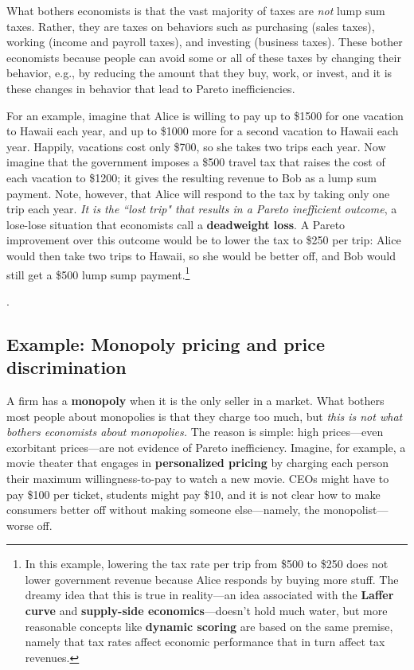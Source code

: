 What bothers economists is that the vast majority of taxes are \emph{not} lump sum taxes. Rather, they are taxes on behaviors such as purchasing (sales taxes), working (income and payroll taxes), and investing (business taxes). These bother economists because people can avoid some or all of these taxes by changing their behavior, e.g., by reducing the amount that they buy, work, or invest, and it is these changes in behavior that lead to Pareto inefficiencies.

For an example, imagine that Alice is willing to pay up to \$1500 for one vacation to Hawaii each year, and up to \$1000 more for a second vacation to Hawaii each year. Happily, vacations cost only \$700, so she takes two trips each year. Now imagine that the government imposes a \$500 travel tax that raises the cost of each vacation to \$1200; it gives the resulting revenue to Bob as a lump sum payment. Note, however, that Alice will respond to the tax by taking only one trip each year. \emph{It is the ``lost trip" that results in a Pareto inefficient outcome}, a  lose-lose situation that economists call a \textbf{deadweight loss}. A Pareto improvement over this outcome would be to lower the tax to \$250 per trip: Alice would then take two trips to Hawaii, so she would be better off, and Bob would still get a \$500 lump sump payment.\footnote{In this example, lowering the tax rate per trip from \$500 to \$250 does not lower government revenue because Alice responds by buying more stuff. The dreamy idea that this is true in reality---an idea associated with the \textbf{Laffer curve} and \textbf{supply-side economics}---doesn't hold much water, but more reasonable concepts like \textbf{dynamic scoring} are based on the same premise, namely that tax rates affect economic performance that in turn affect tax revenues.}

.





\subsection*{Example: Monopoly pricing and price discrimination}
\label{pricediscrimination}

A firm has a \textbf{monopoly} when it is the only seller in a market. What bothers most people about monopolies is that they charge too much, but \emph{this is not what bothers economists about monopolies.} The reason is simple: high prices---even exorbitant prices---are not evidence of Pareto inefficiency. Imagine, for example, a movie theater that engages in \textbf{personalized pricing} by charging each person their maximum willingness-to-pay to watch a new movie. CEOs might have to pay \$100 per ticket, students might pay \$10, and it is not clear how to make consumers better off without making someone else---namely, the monopolist---worse off.

